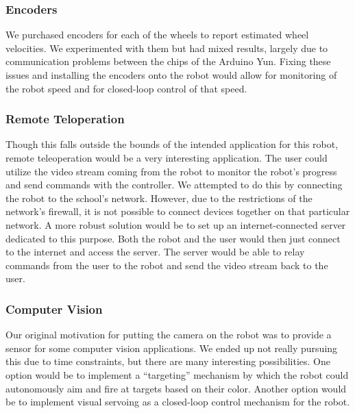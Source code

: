 \documentclass[letterpaper,12pt]{article}
\begin{document}
\subsubsection{Encoders}
We purchased encoders for each of the wheels to report estimated wheel
velocities. We experimented with them but had mixed results, largely due to
communication problems between the chips of the Arduino Yun. Fixing these issues
and installing the encoders onto the robot would allow for monitoring of the
robot speed and for closed-loop control of that speed.

\subsubsection{Remote Teloperation}
Though this falls outside the bounds of the intended application for this robot,
remote teleoperation would be a very interesting application. The user could
utilize the video stream coming from the robot to monitor the robot's progress
and send commands with the controller. We attempted to do this by connecting the
robot to the school's network. However, due to the restrictions of the network's
firewall, it is not possible to connect devices together on that particular
network. A more robust solution would be to set up an internet-connected server
dedicated to this purpose. Both the robot and the user would then just connect
to the internet and access the server. The server would be able to relay
commands from the user to the robot and send the video stream back to the user.

\subsubsection{Computer Vision}
Our original motivation for putting the camera on the robot was to provide a
sensor for some computer vision applications. We ended up not really pursuing
this due to time constraints, but there are many interesting possibilities. One
option would be to implement a ``targeting'' mechanism by which the robot could
autonomously aim and fire at targets based on their color. Another option would
be to implement visual servoing as a closed-loop control mechanism for the
robot.
\end{document}
